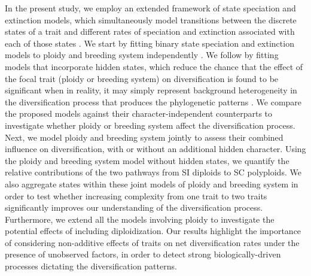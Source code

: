 In the present study, we employ an extended framework of state speciation and extinction models, which simultaneously model transitions between the discrete states of a trait and different rates of speciation and extinction associated with each of those states \citep[`SSE' models;][]{maddison_2007, fitzjohn_2012}.
We start by fitting binary state speciation and extinction models to ploidy and breeding system independently \citep{maddison_2007}.
We follow by fitting models that incorporate hidden states, which reduce the chance that the effect of the focal trait (ploidy or breeding system) on diversification is found to be significant when in reality, it may simply represent background heterogeneity in the diversification process that produces the phylogenetic patterns \citep{beaulieu_2016}. %
We compare the proposed models against their character-independent counterparts \citep{beaulieu_2016} to investigate whether ploidy or breeding system affect the diversification process.
Next, we model ploidy and breeding system jointly to assess their combined influence on diversification, with or without an additional hidden character. %
Using the ploidy and breeding system model without hidden states, we quantify the relative contributions of the two pathways from SI diploids to SC polyploids.
We also aggregate states within these joint models of ploidy and breeding system in order to test whether increasing complexity from one trait to two traits significantly improves our understanding of the diversification process.
Furthermore, we extend all the models involving ploidy to investigate the potential effects of including diploidization.
Our results highlight the importance of considering non-additive effects of traits on net diversification rates  under the presence of unobserved factors, in order to detect strong biologically-driven processes dictating the diversification patterns.
